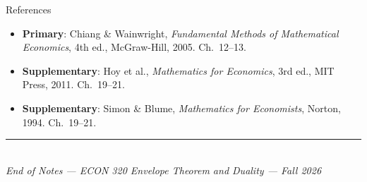 \documentclass[12pt, a4paper]{article}
\theoremstyle{definition}
\begin{document}
\begin{keybox}{References}
\begin{itemize}
  \item \textbf{Primary}: Chiang \& Wainwright, \textit{Fundamental Methods
        of Mathematical Economics}, 4th ed., McGraw-Hill, 2005. Ch.\ 12--13.
  \item \textbf{Supplementary}: Hoy et al., \textit{Mathematics for Economics},
        3rd ed., MIT Press, 2011. Ch.\ 19--21.
  \item \textbf{Supplementary}: Simon \& Blume,
        \textit{Mathematics for Economists}, Norton, 1994. Ch.\ 19--21.
\end{itemize}
\end{keybox}

\vspace{1cm}
\begin{center}
  \textcolor{slate}{\rule{0.5\linewidth}{0.5pt}}\\[6pt]
  \textcolor{slate}{\small\itshape
    End of Notes --- ECON 320 Envelope Theorem and Duality
    --- Fall 2026}
\end{center}
\end{document}
